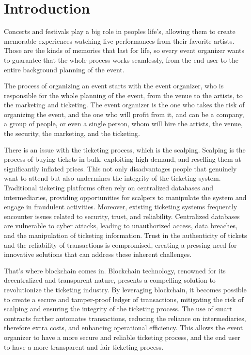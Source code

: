 \chapter{Introduction}

Concerts and festivals play a big role in peoples life's, allowing them to create memorable experiences watching live performances from their favorite artists. Those are the kinds of memories that last for life, so every event organizer wants to guarantee that the whole process works seamlessly, from the end user to the entire background planning of the event.

The process of organizing an event starts with the event organizer, who is responsible for the whole planning of the event, from the venue to the artists, to the marketing and ticketing. The event organizer is the one who takes the risk of organizing the event, and the one who will profit from it, and can be a company, a group of people, or even a single person, whom will hire the artists, the venue, the security, the marketing, and the ticketing.

There is an issue with the ticketing process, which is the scalping. Scalping is the process of buying tickets in bulk, exploiting high demand, and reselling them at significantly inflated prices. This not only disadvantages people that genuinely want to attend but also undermines the integrity of the ticketing system. Traditional ticketing platforms often rely on centralized databases and intermediaries, providing opportunities for scalpers to manipulate the system and engage in fraudulent activities.
Moreover, existing ticketing systems frequently encounter issues related to security, trust, and reliability. Centralized databases are vulnerable to cyber attacks, leading to unauthorized access, data breaches, and the manipulation of ticketing information. Trust in the authenticity of tickets and the reliability of transactions is compromised, creating a pressing need for innovative solutions that can address these inherent challenges.

That's where blockchain comes in. Blockchain technology, renowned for its decentralized and transparent nature, presents a compelling solution to revolutionize the ticketing industry. By leveraging blockchain, it becomes possible to create a secure and tamper-proof ledger of transactions, mitigating the risk of scalping and ensuring the integrity of the ticketing process. The use of smart contracts further automates transactions, reducing the reliance on intermediaries, therefore extra costs, and enhancing operational efficiency. This allows the event organizer to have a more secure and reliable ticketing process, and the end user to have a more transparent and fair ticketing process.





